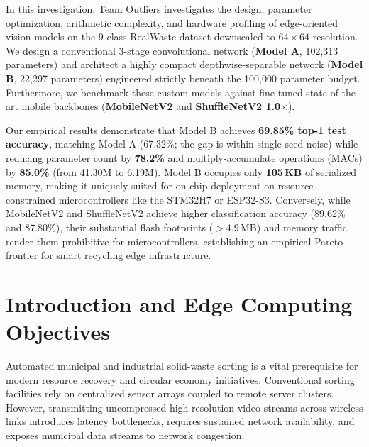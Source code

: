 \documentclass[11pt,a4paper]{article}
\begin{document}
In this investigation, Team Outliers investigates the design, parameter optimization, arithmetic complexity, and hardware profiling of edge-oriented vision models on the 9-class RealWaste dataset downscaled to $64 \times 64$ resolution. We design a conventional 3-stage convolutional network (\textbf{Model A}, 102,313 parameters) and architect a highly compact depthwise-separable network (\textbf{Model B}, 22,297 parameters) engineered strictly beneath the 100,000 parameter budget. Furthermore, we benchmark these custom models against fine-tuned state-of-the-art mobile backbones (\textbf{MobileNetV2} and \textbf{ShuffleNetV2 1.0$\times$}). 

Our empirical results demonstrate that Model B achieves \textbf{69.85\% top-1 test accuracy}, matching Model A (67.32\%; the gap is within single-seed noise) while reducing parameter count by \textbf{78.2\%} and multiply-accumulate operations (MACs) by \textbf{85.0\%} (from 41.30M to 6.19M). Model B occupies only \textbf{105\,KB} of serialized memory, making it uniquely suited for on-chip deployment on resource-constrained microcontrollers like the STM32H7 or ESP32-S3. Conversely, while MobileNetV2 and ShuffleNetV2 achieve higher classification accuracy (89.62\% and 87.80\%), their substantial flash footprints ($>4.9$\,MB) and memory traffic render them prohibitive for microcontrollers, establishing an empirical Pareto frontier for smart recycling edge infrastructure.

\newpage
\tableofcontents
\newpage
{}
\setcounter{page}{1}

\section{Introduction and Edge Computing Objectives}
\label{sec:intro}

Automated municipal and industrial solid-waste sorting is a vital prerequisite for modern resource recovery and circular economy initiatives. Conventional sorting facilities rely on centralized sensor arrays coupled to remote server clusters. However, transmitting uncompressed high-resolution video streams across wireless links introduces latency bottlenecks, requires sustained network availability, and exposes municipal data streams to network congestion.
\end{document}
